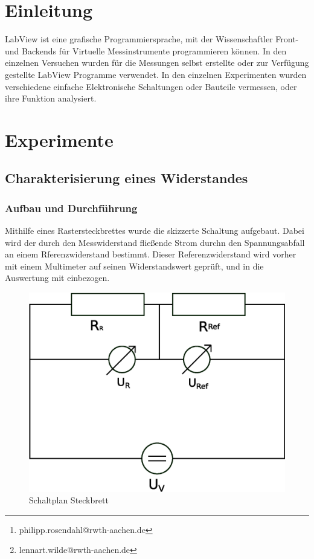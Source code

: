 \documentclass[12pt,twoside,a4paper]{scrartcl}
\author{Philipp Rosendahl Mat.-Nr: 378092\thanks{philipp.rosendahl@rwth-aachen.de}
		\and Lennart Wilde, Mat.-Nr: 381588\thanks{lennart.wilde@rwth-aachen.de}}
\begin{document}
\maketitle
\newpage

\tableofcontents
\newpage


\section{Einleitung}
  LabView ist eine grafische Programmiersprache, mit der Wissenschaftler Front- und Backends für Virtuelle Messinstrumente programmieren können.
	In den einzelnen Versuchen wurden für die Messungen selbst erstellte oder zur Verfügung gestellte LabView Programme verwendet. In den einzelnen Experimenten wurden verschiedene einfache Elektronische Schaltungen oder Bauteile vermessen, oder ihre Funktion analysiert.

	\section{Experimente}
		\subsection{Charakterisierung eines Widerstandes}

			\subsubsection{Aufbau und Durchführung}
				Mithilfe eines Rastersteckbrettes wurde die skizzerte Schaltung aufgebaut. Dabei wird der durch den Messwiderstand fließende Strom durchn den Spannungsabfall an einem Rferenzwiderstand bestimmt. Dieser Referenzwiderstand wird vorher mit einem Multimeter auf seinen Widerstandswert geprüft, und in die Auswertung mit einbezogen.

				\begin{figure}[H]
					\centering

					\includegraphics[width = 0.8 \textwidth]{Pictures/resistance}

					\caption{Schaltplan Steckbrett}
				\end{figure}
\end{document}
